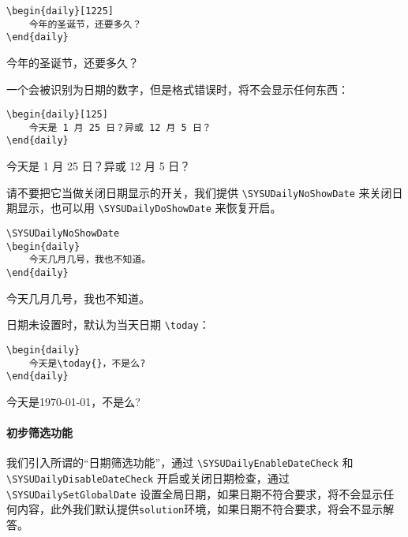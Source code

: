 \documentclass{SYSUDaily}
\begin{document}
\begin{multicols}{2}
	\begin{lstlisting}
\begin{daily}[1225]
	今年的圣诞节，还要多久？
\end{daily}
  \end{lstlisting}
	\small
	\begin{daily}[1225]
		今年的圣诞节，还要多久？
	\end{daily}
\end{multicols}

一个会被识别为日期的数字，但是格式错误时，将不会显示任何东西：
\begin{multicols}{2}
	\begin{lstlisting}
\begin{daily}[125]
	今天是 1 月 25 日？异或 12 月 5 日？
\end{daily}
  \end{lstlisting}
	\small
	\begin{daily}[125]
		今天是 1 月 25 日？异或 12 月 5 日？
	\end{daily}
\end{multicols}
请不要把它当做关闭日期显示的开关，我们提供 \verb|\SYSUDailyNoShowDate| 来关闭日期显示，也可以用 \verb|\SYSUDailyDoShowDate| 来恢复开启。
\begin{multicols}{2}
	\begin{lstlisting}
\SYSUDailyNoShowDate
\begin{daily}
	今天几月几号，我也不知道。
\end{daily}
  \end{lstlisting}
	\small
	\SYSUDailyNoShowDate
	\begin{daily}
		今天几月几号，我也不知道。
	\end{daily}
	\SYSUDailyDoShowDate
\end{multicols}

日期未设置时，默认为当天日期 \verb|\today|：
\begin{multicols}{2}
	\begin{lstlisting}
\begin{daily}
	今天是\today{}，不是么?
\end{daily}
  \end{lstlisting}
	\small
	\begin{daily}
		今天是\today{}，不是么?
	\end{daily}
\end{multicols}

\paragraph{初步筛选功能}
我们引入所谓的``日期筛选功能''，通过 \verb|\SYSUDailyEnableDateCheck| 和 \verb|\SYSUDailyDisableDateCheck| 开启或关闭日期检查，通过\verb|\SYSUDailySetGlobalDate| 设置全局日期，如果日期不符合要求，将不会显示任何内容，此外我们默认提供\verb|solution|环境，如果日期不符合要求，将会不显示解答。
\end{document}
